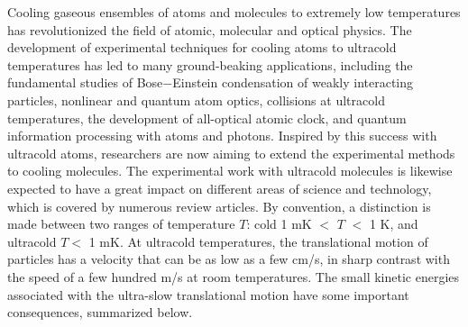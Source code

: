  
Cooling gaseous ensembles of atoms and molecules to extremely low temperatures has revolutionized the 
field of atomic, molecular and optical physics. 
The development of experimental techniques for cooling atoms to ultracold temperatures has led to many ground-beaking applications\cite{southwell2002, chu2002},  
including the fundamental studies of Bose$-$Einstein condensation of weakly interacting particles\cite{anglin2002}, nonlinear and quantum atom 
optics\cite{rolston2002}, collisions at ultracold temperatures\cite{burnett2002}, the development of all-optical atomic
clock\cite{udem2002},
and quantum information processing with atoms and photons\cite{monroe2002}. 
Inspired by this success with 
ultracold atoms, researchers are now aiming to extend the experimental methods to cooling molecules.
The experimental work with ultracold molecules is likewise expected to have  a great
impact on different areas of science and technology, which is covered by numerous review articles\cite{our-njp-review, friedrich2009, schnell2009, Bell2009, krems2010cold, Ni2009,
Jin2011, Jin2012, quemener2012, Baranov2012}. 
By convention, a distinction is made between two ranges of 
temperature $T$: cold 1 mK $<$ $T$ $<$ 1 K, and ultracold $T < $ 1 mK.   
At ultracold temperatures, the translational motion of particles has a velocity that can be as low as a few cm/s, in 
sharp contrast with the speed of a few hundred m/s at room temperatures. 
The small kinetic energies associated with the ultra-slow translational motion have some important consequences, summarized below.

